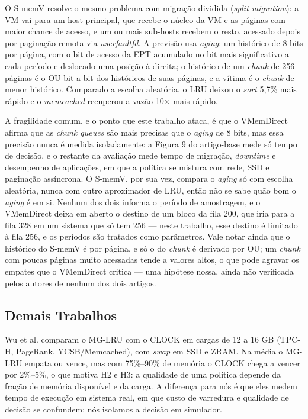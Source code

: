 \documentclass[12pt]{article}
\begin{document}
O S-memV \cite{suetake2018smemv} resolve o mesmo problema com migração dividida (\textit{split migration}): a VM vai para um host principal, que recebe o núcleo da VM e as páginas com maior chance de acesso, e um ou mais sub-hosts recebem o resto, acessado depois por paginação remota via \textit{userfaultfd}. A previsão usa \textit{aging}: um histórico de 8 bits por página, com o bit de acesso da EPT acumulado no bit mais significativo a cada período e deslocado uma posição à direita; o histórico de um \textit{chunk} de 256 páginas é o OU bit a bit dos históricos de suas páginas, e a vítima é o \textit{chunk} de menor histórico. Comparado a escolha aleatória, o LRU deixou o \textit{sort} 5,7\% mais rápido e o \textit{memcached} recuperou a vazão 10$\times$ mais rápido.

A fragilidade comum, e o ponto que este trabalho ataca, é que o VMemDirect afirma que as \textit{chunk queues} são mais precisas que o \textit{aging} de 8 bits, mas essa precisão nunca é medida isoladamente: a Figura 9 do artigo-base mede só tempo de decisão, e o restante da avaliação mede tempo de migração, \textit{downtime} e desempenho de aplicações, em que a política se mistura com rede, SSD e paginação assíncrona. O S-memV, por sua vez, compara o \textit{aging} só com escolha aleatória, nunca com outro aproximador de LRU, então não se sabe quão bom o \textit{aging} é em si. Nenhum dos dois informa o período de amostragem, e o VMemDirect deixa em aberto o destino de um bloco da fila 200, que iria para a fila 328 em um sistema que só tem 256 — neste trabalho, esse destino é limitado à fila 256, e os períodos são tratados como parâmetros. Vale notar ainda que o histórico do S-memV é por página, e só o do \textit{chunk} é derivado por OU; um \textit{chunk} com poucas páginas muito acessadas tende a valores altos, o que pode agravar os empates que o VMemDirect critica — uma hipótese nossa, ainda não verificada pelos autores de nenhum dos dois artigos.

\subsection{Demais Trabalhos}

Wu et al. \cite{wu2024characterizing} comparam o MG-LRU com o CLOCK em cargas de 12 a 16 GB (TPC-H, PageRank, YCSB/Memcached), com \textit{swap} em SSD e ZRAM. Na média o MG-LRU empata ou vence, mas com 75\%--90\% de memória o CLOCK chega a vencer por 2\%--5\%, o que motiva H2 e H3: a qualidade de uma política depende da fração de memória disponível e da carga. A diferença para nós é que eles medem tempo de execução em sistema real, em que custo de varredura e qualidade de decisão se confundem; nós isolamos a decisão em simulador.
\end{document}
